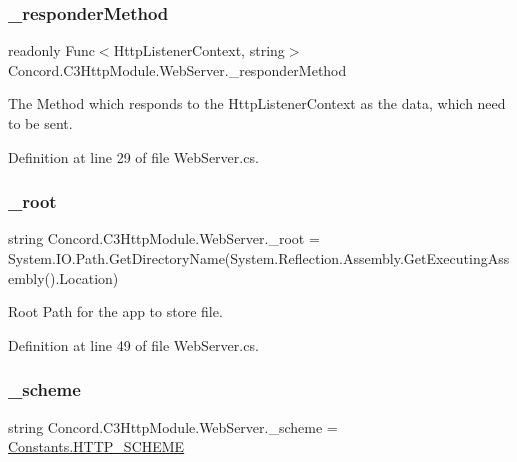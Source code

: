 \subsubsection{\texorpdfstring{\_responderMethod}{\_responderMethod}}
{\footnotesize\ttfamily readonly Func$<$Http\+Listener\+Context, string$>$ Concord.\+C3\+Http\+Module.\+Web\+Server.\+\_\+responder\+Method\hspace{0.3cm}{\ttfamily [private]}}



The Method which responds to the Http\+Listener\+Context as the data, which need to be sent. 



Definition at line 29 of file Web\+Server.\+cs.

\mbox{\label{class_concord_1_1_c3_http_module_1_1_web_server_a4119b37aad2d9713f2307bd854de122b}} 
\subsubsection{\texorpdfstring{\_root}{\_root}}
{\footnotesize\ttfamily string Concord.\+C3\+Http\+Module.\+Web\+Server.\+\_\+root = System.\+I\+O.\+Path.\+Get\+Directory\+Name(System.\+Reflection.\+Assembly.\+Get\+Executing\+Assembly().Location)\hspace{0.3cm}{\ttfamily [private]}}



Root Path for the app to store file. 



Definition at line 49 of file Web\+Server.\+cs.

\mbox{\label{class_concord_1_1_c3_http_module_1_1_web_server_a1d7bbb290d534e300796f0cc3024ca53}} 
\subsubsection{\texorpdfstring{\_scheme}{\_scheme}}
{\footnotesize\ttfamily string Concord.\+C3\+Http\+Module.\+Web\+Server.\+\_\+scheme = \mbox{\hyperlink{class_concord_1_1_c3_http_module_1_1_constants_ad5d0cf769b25bef58e712036c67b915b}{Constants.\+H\+T\+T\+P\+\_\+\+S\+C\+H\+E\+ME}}\hspace{0.3cm}{\ttfamily [private]}}



